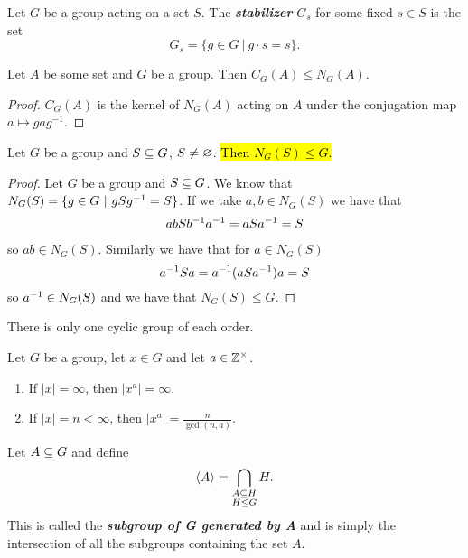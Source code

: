 \begin{defn}
Let $G$ be a group acting on a set $S$. The \textit{\textbf{stabilizer}} $G_s$ for some fixed $s\in S$ is the set 
\[G_s = \{g\in G\ |\ g\cdot s = s\}.\]
\end{defn}

\begin{prop}
Let $A$ be some set and $G$ be a group. Then $C_G(A)\leq N_G(A)$.
\end{prop}
\begin{proof}
$C_G(A)$ is the kernel of $N_G(A)$ acting on $A$ under the conjugation map $a\mapsto gag^{-1}$.
\end{proof}

\nl

\begin{prop}
Let $G$ be a group and $S\subseteq G$, $S\neq \varnothing$. \hl{Then $N_G(S) \leq G$.}
\end{prop}

\begin{proof}
Let $G$ be a group and $S\subseteq G$. We know that $N_G(S) = \{g \in G\ |\ gSg^{-1} = S\}$. If we take $a, b\in N_G(S)$ we have that 
\begin{align*}
abSb^{-1} a^{-1} = aSa^{-1} = S
\end{align*}
so $ab \in N_G(S)$. Similarly we have that for $a\in N_G(S)$
\[a^{-1} Sa = a^{-1}(aSa^{-1})a = S\]
so $a^{-1} \in N_G(S)$ and we have that $N_G(S) \leq G$.
\end{proof}

\nl
\begin{thm}
There is only one cyclic group of each order.
\end{thm}

\nl
\begin{prop}
Let $G$ be a group, let $x\in G$ and let $a\in \mathbb{Z}^\times$.
\begin{enumerate}
\item If $|x|=\infty$, then $|x^a| = \infty$.
\item If $|x| = n< \infty$, then $|x^a| = \frac{n}{\gcd(n,a)}$.
\end{enumerate}
\end{prop}

\nl
\begin{defn}
Let $A\subseteq G$ and define 
\[\langle A\rangle = \bigcap_{\substack{ A\subseteq H\\H\leq G}} H. \]
This is called the \textit{\textbf{subgroup of G generated by A}} and is simply the intersection of all the subgroups containing the set $A$.
\end{defn}


